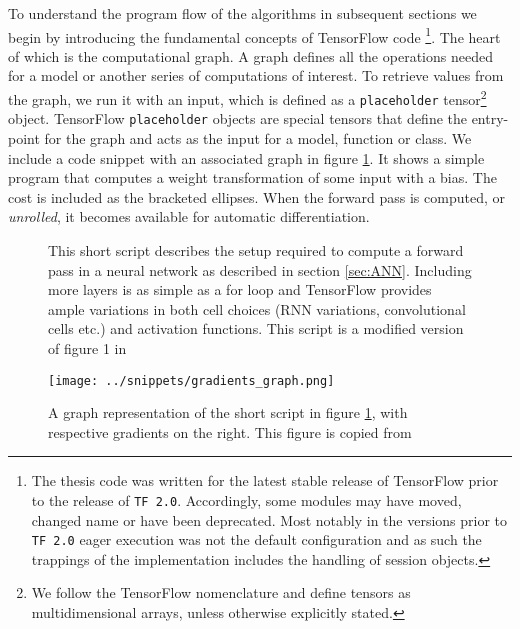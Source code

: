 To understand the program flow of the algorithms in subsequent sections we begin by introducing the fundamental concepts of TensorFlow code \footnote{The thesis code was written for the latest stable release of TensorFlow prior to the release of \lstinline{TF 2.0}. Accordingly, some modules may have moved, changed name or have been deprecated. Most notably in the versions prior to \lstinline{TF 2.0} eager execution was not the default configuration and as such the trappings of the implementation includes the handling of session objects.}. The heart of which is the computational graph. A graph defines all the operations needed for a model or another series of computations of interest. To retrieve values from the graph, we run it with an input, which is defined as a \lstinline{placeholder} tensor\footnote{We follow the TensorFlow nomenclature and define tensors as multidimensional arrays, unless otherwise explicitly stated.} object. TensorFlow \lstinline{placeholder} objects are special tensors that define the entry-point for the graph and acts as the input for a model, function or class. We include a code snippet with an associated graph in figure \ref{fig:graph}. It shows a simple program that computes a weight transformation of some input with a bias. The cost is included as the bracketed ellipses. When the forward pass is computed, or \textit{unrolled}, it becomes available for automatic differentiation. 

\begin{figure}
\centering
\begin{minipage}[c]{\linewidth}

\end{minipage}
\caption[A forward pass in TensorFlow]{This short script describes the setup required to compute a forward pass in a neural network as described in section \ref{sec:ANN}. Including more layers is as simple as a for loop and TensorFlow provides ample variations in both cell choices (RNN variations, convolutional cells etc.) and activation functions. This script is a modified version of figure 1 in \cite{tensorflow}}\label{fig:graph}
\end{figure}

\begin{figure}
\centering
\texttt{[image: ../snippets/gradients\_graph.png]}
\caption[Graph representation of the forward pass and gradients of a simple dense neural network]{A graph representation of the short script in figure \ref{fig:graph}, with respective gradients on the right. This figure is copied from \citet{tensorflow}}\label{fig:grad_graph}
\end{figure}

